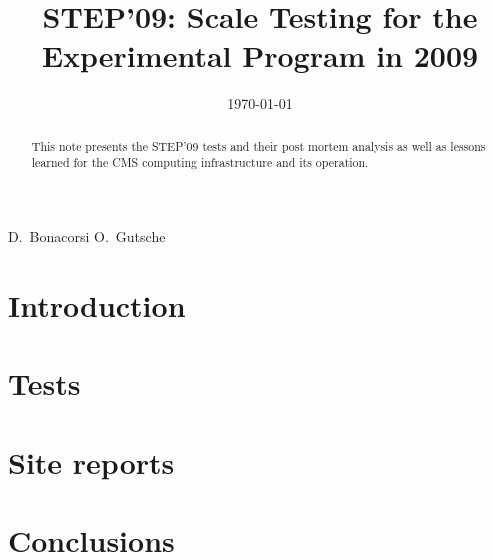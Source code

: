 \documentclass{cmspaper}
\begin{document}
\begin{titlepage}


  \date{\today}

  \title{STEP'09: Scale Testing for the Experimental Program in 2009}

  \begin{Authlist}
    D.~Bonacorsi
     O.~Gutsche
  \end{Authlist}


  \begin{abstract}
    This note presents the STEP'09 tests and their post mortem
    analysis as well as lessons learned for the CMS computing
    infrastructure and its operation.
  \end{abstract} 


\end{titlepage}

\setcounter{tocdepth}{2}
\tableofcontents

\newpage

\section{Introduction}
\label{sec:intro}

\newpage

\section{Tests}
\label{sec:tests}









\newpage

\section{Site reports}
\label{sec:sites}















\newpage

\section{Conclusions}
\label{sec:con}


\end{document}
